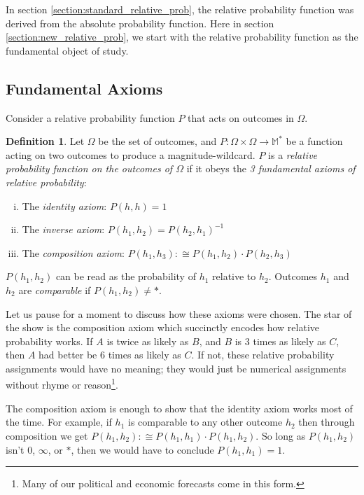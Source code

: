 \documentclass[twoside]{article}
\theoremstyle{plain}%
\theoremstyle{definition}
\newtheorem{definition}{Definition}[section]
\theoremstyle{remark}
\begin{document}
In section \ref{section:standard_relative_prob}, the relative probability function was derived from the absolute probability function. Here in section \ref{section:new_relative_prob}, we start with the relative probability function as the fundamental object of study.

\subsection{Fundamental Axioms}

Consider a relative probability function \(P\) that acts on outcomes in \(\Omega\).

\begin{definition}
\label{def:fundamental_laws}
Let \(\Omega\) be the set of outcomes, and \(P: \Omega \times \Omega \rightarrow \mathbb{M}^*\) be a function acting on two outcomes to produce a magnitude-wildcard. \(P\) is a \textit{relative probability function on the outcomes of \(\Omega\)} if it obeys the \textit{3 fundamental axioms of relative probability}:

\begin{enumerate}[(i)]
\item The \textit{identity axiom}: \(P(h, h) = 1\)
\item The \textit{inverse axiom}: \(P(h_1, h_2) = P(h_2, h_1)^{-1}\)
\item The \textit{composition axiom}: \(P(h_1, h_3) :\cong P(h_1, h_2) \cdot P(h_2, h_3)\)
\end{enumerate}

\end{definition}

\(P(h_1, h_2)\) can be read as the probability of \(h_1\) relative to \(h_2\). Outcomes \(h_1\) and \(h_2\) are \textit{comparable} if \(P(h_1, h_2) \neq \ast\).

Let us pause for a moment to discuss how these axioms were chosen. The star of the show is the composition axiom which succinctly encodes how relative probability works. If \(A\) is twice as likely as \(B\), and \(B\) is 3 times as likely as \(C\), then \(A\) had better be 6 times as likely as \(C\). If not, these relative probability assignments would have no meaning; they would just be numerical assignments without rhyme or reason\footnote{Many of our political and economic forecasts come in this form.}.

The composition axiom is enough to show that the identity axiom works most of the time. For example, if \(h_1\) is comparable to any other outcome \(h_2\) then through composition we get \(P(h_1, h_2) :\cong P(h_1, h_1) \cdot P(h_1, h_2)\). So long as \(P(h_1, h_2)\) isn't \(0\), \(\infty\), or \(\ast\), then we would have to conclude \(P(h_1, h_1) = 1\).
\end{document}
